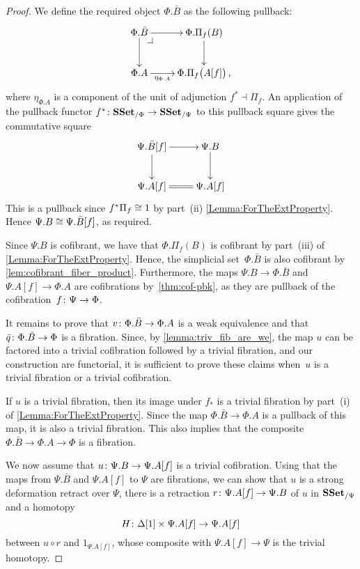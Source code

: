 \documentclass[reqno,10pt,a4paper,oneside,draft]{amsart}
\begin{document}
\begin{proof} We define the required object $\Phi.\bar{B}$ as the following pullback:
\[\xymatrix{
\Phi.\bar{B} \ar[d] \ar[r] \drpullback & \Phi.\Pi_f(B) \ar[d] \\
\Phi.A \ar[r]_-{\eta_{\Phi.A}} & \Phi.\Pi_f \big( A[f]  \big) \, ,
}\]
where $\eta_{\Phi.A}$ is  a component of the unit of adjunction  $f^* \dashv \Pi_f$. An application of the pullback functor $f^* \colon \mathbf{SSet}_{/\Phi} \to \mathbf{SSet}_{/\Psi}$ to this pullback square gives the commutative square
\[\xymatrix{
\Psi.\bar{B}[f] \ar[d] \ar[r]  & \Psi.B \ar[d] \\
\Psi.A[f] \ar@{=}[r] &\Psi.A[f] 
}\]
This is a pullback since $f^* \Pi_f \cong 1$ by part~(ii) \cref{Lemma:ForTheExtProperty}. Hence 
$\Psi.B \cong \Psi.\bar{B}[f]$, as required.


Since $\Psi.B$ is cofibrant, we have that $\Phi.\Pi_f(B)$ is cofibrant by part~(iii) of  \cref{Lemma:ForTheExtProperty}. Hence, the simplicial set~$\Phi.\bar{B}$  is also cofibrant by \cref{lem:cofibrant_fiber_product}. Furthermore, the maps $\Psi.B \rightarrow \Phi.\bar{B}$ and~$\Psi.A[f] \rightarrow \Phi.A$ are cofibrations by~\cref{thm:cof-pbk}, as they are pullback of the cofibration~$f \colon \Psi \rightarrow \Phi$.





It remains to prove that $v \colon \Phi.\bar{B} \rightarrow \Phi.A$ is a weak equivalence and that 
$\bar{q} \colon \Phi.\bar{B} \rightarrow \Phi$ is a fibration. Since, by \cref{lemma:triv_fib_are_we}, the map $u$ can be factored into a trivial cofibration followed by a trivial fibration, and our construction are functorial, it is sufficient to prove these claims when~$u$ is a trivial fibration or a trivial cofibration.

If $u$ is a trivial fibration, then its image under $f_*$ is a trivial fibration by 
part~(i) of \cref{Lemma:ForTheExtProperty}. Since the map $\Phi.\bar{B} \rightarrow \Phi.A$ is a pullback of this map,
it is also a trivial fibration. This also implies that the composite $\Phi.\bar{B} \rightarrow \Phi.A \rightarrow \Phi$ is a fibration.


We now assume that $u \colon \Psi.B \rightarrow \Psi.A[f]$ is a trivial cofibration. Using that the maps from $\Psi.\bar{B}$ and $\Psi.A[f]$ to $\Psi$ are fibrations, we can show that $u$ is a strong deformation retract over $\Psi$, \ie there is a retraction $r \colon \Psi.A[f] \rightarrow \Psi.B$ of $u$ in $\mathbf{SSet}_{/\Psi}$ and a homotopy 
\[
H \colon \Delta[1] \times \Psi.A[f] \rightarrow \Psi.A[f]
\] 
between 
$u \circ r$ and $1_{\Psi.A[f]}$, whose composite with $\Psi.A[f] \rightarrow \Psi$ is the trivial homotopy.


\end{proof}
\end{document}
